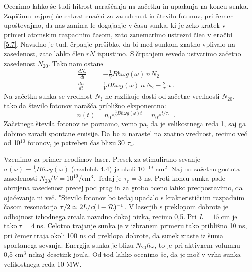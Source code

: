 Ocenimo lahko še tudi hitrost naraščanja na začetku in upadanja na koncu
sunka. Zapišimo najprej še enkrat enačbi za zasedenost in število
fotonov, pri čemer upoštevajmo, da nas zanima le dogajanje v času sunka,
ki je zeko kratek v primeri atomskim razpadnim časom, zato zanemarimo
ustrezni člen v enačbi \ref{5.7}. Navadno je tudi črpanje prešibko, da
bi med sunkom znatno vplivalo na zasedenost, zato lahko člen $rN$
izpustimo. S črpanjem seveda ustvarimo začetno zasedenost $N_{20}$. Tako
nam ostane 
\begin{eqnarray}  \label{5.32}
\frac{d N_2}{d t}&=&-\frac{1}{V}B\hbar\omega g(\omega)\,n\,N_2 \\
\frac{d n}{d t}&=&\frac{1}{V}B\hbar\omega g(\omega)\,n\,N_2 - \frac{2}{\tau}%
\,n\;.
\end{eqnarray}
Na začetku sunka se vrednost $N_2$ ne razlikuje dosti od začetne vrednosti 
$N_{20}$, tako da število fotonov narašča približno eksponentno: 
\begin{equation}  \label{5.33}
n(t)=n_0e^{\frac{1}{V}B\hbar\omega g(\omega)t}= n_0e^{t/\tau_r}\;\;.
\end{equation}
Začetnega števila fotonov ne poznamo, vemo pa, da je velikostnega reda 1,
saj ga dobimo zaradi spontane emisije. Da bo $n$ narastel na znatno
vrednost, recimo več od 10$^{10}$ fotonov, je potreben čas blizu 30 $%
\tau_r $.

Vzemimo za primer neodimov laser. Presek za stimulirano sevanje $\sigma
(\omega )=\frac{1}{c}B\hbar \omega g(\omega )$ (razdelek 4.4) je okoli 10$%
^{-19}$ cm$^{2}$. Naj bo začetna gostota zasedenosti $N_{20}/V=10^{19}/%
\mbox{cm}^{3}$. Tedaj je $\tau _{r}=3$ ns. Proti koncu sunka pade obrnjena
zasedenost precej pod prag in za grobo oceno lahko predpostavimo, da
ojačevanja ni več. "Stevilo fotonov bo tedaj upadalo s
krakterističnim razpadnim časom resonatorja $\tau /2\simeq 2L/c(1-{\cal R%
})^{-1}$. V laserjih s preklopom dobrote je odbojnost izhodnega zrcala
navadno dokaj nizka, recimo 0,5. Pri $L=15\;\mbox{cm}$ je tako $\tau =4$ ns.
Celotno trajanje sunka je v izbranem primeru tako približno 10 ns, pri
čemer traja okoli 100 ns od preklopa dobrote, da sunek zraste iz šuma
spontanega sevanja. Energija sunka je blizu $N_{20}\hbar \omega $, to je pri
aktivnem volumnu 0,5 cm$^{3}$ nekaj desetink joula. Od tod lahko ocenimo
še, da je moč v vrhu sunka velikostnega reda 10 MW.

